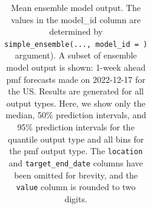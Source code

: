 \documentclass[
]{article}
\begin{document}
\begin{longtable}[]{@{}
  >{\raggedright\arraybackslash}p{}
  >{\raggedright\arraybackslash}p{}
  >{\raggedleft\arraybackslash}p{}
  >{\raggedright\arraybackslash}p{}
  >{\raggedright\arraybackslash}p{}
  >{\raggedright\arraybackslash}p{}
  >{\raggedleft\arraybackslash}p{}@{}}

\caption{\label{tbl-mean-ensemble}Mean ensemble model output. The values
in the model\_id column are determined by
\texttt{simple\_ensemble(...,\ model\_id\ =\ )} argument). A subset of
ensemble model output is shown: 1-week ahead pmf forecasts made on
2022-12-17 for the US. Results are generated for all output types. Here,
we show only the median, 50\% prediction intervals, and 95\% prediction
intervals for the quantile output type and all bins for the pmf output
type. The \texttt{location} and \texttt{target\_end\_date} columns have
been omitted for brevity, and the \texttt{value} column is rounded to
two digits.}

\tabularnewline


\end{longtable}
\end{document}
